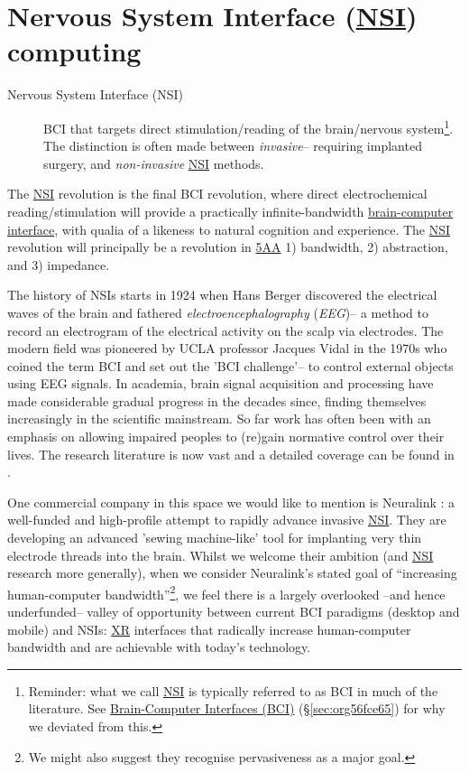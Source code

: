 \documentclass[logo,bsc,singlespacing,parskip]{infthesis}
\begin{document}
\section{Nervous System Interface (\hyperref[org79fc546]{NSI}) computing}
\label{sec:org91133e4}
\begin{mdframed}
\begin{description}
\item[{Nervous System Interface (\label{org79fc546}NSI)}] BCI that targets direct stimulation/reading of the brain/nervous system\footnote{Reminder: what we call \hyperref[org79fc546]{NSI} is typically referred to as BCI in much of the literature. See \hyperref[sec:org56fce65]{Brain-Computer Interfaces (BCI)} (\S \ref{sec:org56fce65}) for why we deviated from this.}.
The distinction is often made between \emph{invasive}-- requiring implanted surgery, and \emph{non-invasive} \hyperref[org79fc546]{NSI} methods.
\end{description}
\end{mdframed}

The \hyperref[org79fc546]{NSI} revolution is the final BCI revolution, where direct electrochemical reading/stimulation will provide a practically infinite-bandwidth \hyperref[orgeddbcd6]{brain-computer interface}, with qualia of a likeness to natural cognition and experience.
The \hyperref[org79fc546]{NSI} revolution will principally be a revolution in \hyperref[org85f90e8]{5AA} 1) bandwidth, 2) abstraction, and 3) impedance.

The history of NSIs starts in 1924 when Hans Berger discovered the electrical waves of the brain and fathered \emph{electroencephalography} (\emph{EEG})--  a method to record an electrogram of the electrical activity on the scalp via electrodes.
The modern field was pioneered by UCLA professor Jacques Vidal in the 1970s who coined the term BCI and set out the 'BCI challenge'-- to control external objects using EEG signals.
In academia, brain signal acquisition and processing have made considerable gradual progress in the decades since, finding themselves increasingly in the scientific mainstream.
So far work has often been with an emphasis on allowing impaired peoples to (re)gain normative control over their lives.
The research literature is now vast and a detailed coverage can be found in \autocite{kawala-sterniukSummaryFiftyYears2021}.

One commercial company in this space we would like to mention is Neuralink \autocite{muskNeuralink}: a well-funded and high-profile attempt to rapidly advance invasive \hyperref[org79fc546]{NSI}.
They are developing an advanced 'sewing machine-like' tool for implanting very thin electrode threads into the brain.
Whilst we welcome their ambition (and \hyperref[org79fc546]{NSI} research more generally), when we consider Neuralink's stated goal of ``increasing human-computer bandwidth''\footnote{We might also suggest they recognise pervasiveness as a major goal.}, we feel there is a largely overlooked --and hence underfunded-- valley of opportunity between current BCI paradigms (desktop and mobile) and NSIs: \hyperref[org1d567af]{XR} interfaces that radically increase human-computer bandwidth and are achievable with today's technology.
\end{document}
